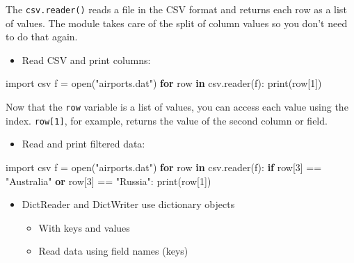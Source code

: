 \documentclass[
  letterpaper,
]{scrbook}
\newenvironment{Shaded}{\begin{snugshade}}{\end{snugshade}}
\newcommand{\BuiltInTok}[1]{\textcolor[rgb]{0.00,0.23,0.31}{#1}}
\newcommand{\ControlFlowTok}[1]{\textcolor[rgb]{0.00,0.23,0.31}{\textbf{#1}}}
\newcommand{\DecValTok}[1]{\textcolor[rgb]{0.68,0.00,0.00}{#1}}
\newcommand{\ImportTok}[1]{\textcolor[rgb]{0.00,0.46,0.62}{#1}}
\newcommand{\KeywordTok}[1]{\textcolor[rgb]{0.00,0.23,0.31}{\textbf{#1}}}
\newcommand{\NormalTok}[1]{\textcolor[rgb]{0.00,0.23,0.31}{#1}}
\newcommand{\OperatorTok}[1]{\textcolor[rgb]{0.37,0.37,0.37}{#1}}
\newcommand{\StringTok}[1]{\textcolor[rgb]{0.13,0.47,0.30}{#1}}
\providecommand{\tightlist}{%
  \setlength{\itemsep}{0pt}\setlength{\parskip}{0pt}}
\begin{document}
The \texttt{csv.reader()} reads a file in the CSV format and returns
each row as a list of values. The module takes care of the split of
column values so you don't need to do that again.

\begin{itemize}
\tightlist
\item
  Read CSV and print columns:
\end{itemize}

\begin{Shaded}
\begin{Highlighting}[]
\ImportTok{import}\NormalTok{ csv}
\NormalTok{f }\OperatorTok{=} \BuiltInTok{open}\NormalTok{(}\StringTok{"airports.dat"}\NormalTok{)}
\ControlFlowTok{for}\NormalTok{ row }\KeywordTok{in}\NormalTok{ csv.reader(f):}
    \BuiltInTok{print}\NormalTok{(row[}\DecValTok{1}\NormalTok{])}
\end{Highlighting}
\end{Shaded}

Now that the \texttt{row} variable is a list of values, you can access
each value using the index. \texttt{row{[}1{]}}, for example, returns
the value of the second column or field.

\begin{itemize}
\tightlist
\item
  Read and print filtered data:
\end{itemize}

\begin{Shaded}
\begin{Highlighting}[]
\ImportTok{import}\NormalTok{ csv}
\NormalTok{f }\OperatorTok{=} \BuiltInTok{open}\NormalTok{(}\StringTok{"airports.dat"}\NormalTok{)}
\ControlFlowTok{for}\NormalTok{ row }\KeywordTok{in}\NormalTok{ csv.reader(f):}
    \ControlFlowTok{if}\NormalTok{ row[}\DecValTok{3}\NormalTok{] }\OperatorTok{==} \StringTok{"Australia"} \KeywordTok{or}\NormalTok{ row[}\DecValTok{3}\NormalTok{] }\OperatorTok{==} \StringTok{"Russia"}\NormalTok{:}
        \BuiltInTok{print}\NormalTok{(row[}\DecValTok{1}\NormalTok{])}
\end{Highlighting}
\end{Shaded}

\begin{itemize}
\tightlist
\item
  DictReader and DictWriter use dictionary objects

  \begin{itemize}
  \tightlist
  \item
    With keys and values
  \item
    Read data using field names (keys)
  \end{itemize}
\end{itemize}
\end{document}
